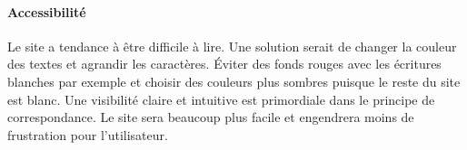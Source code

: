 \documentclass[9pt]{report}
\begin{document}
\begin{multicols*}{2}
\paragraph{Accessibilité}
Le site a tendance à être difficile à lire. Une solution serait de changer la couleur des textes et agrandir les caractères. Éviter des fonds rouges avec les écritures blanches par exemple et choisir des couleurs plus sombres puisque le reste du site est blanc. Une visibilité claire et intuitive est primordiale dans le principe de correspondance. Le site sera beaucoup plus facile et engendrera moins de frustration pour l’utilisateur.
\end{multicols*}
\end{document}
